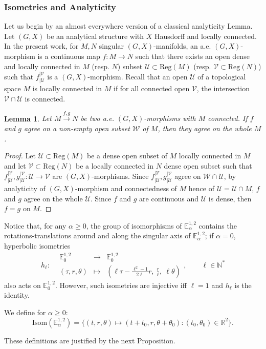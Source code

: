 \documentclass[a4paper,12pt]{article}
\def\U{\mathcal U}
\def\isom{Isom}
\def\V{\mathcal V}
\def\E{\mathbf E}
\def\N{\mathbb N}
\def\E{\mathbb{E}}
\def\RR{\mathbb{R}}
\newcommand{\mass}[1]{{\mathbb E}^{1,2}_{#1}}
\def\isom{\mathrm{Isom}}
\def\Reg{\mathrm{Reg}}
\def\reg{\Reg}
\newcommand{\fonction}[5]{\displaystyle#1:\begin{array}{l|rcl}
& \displaystyle #2 & \longrightarrow & \displaystyle #3 \\
    & \displaystyle #4 & \longmapsto & \displaystyle #5 \end{array}}
\newtheorem{lemou}{Lemma}[section]          %
\begin{document}
\subsubsection{Isometries and Analyticity} \label{sec:isometries}
Let us begin by an almost everywhere version of a classical analyticity Lem\-ma.
Let $(G,X)$ be an analytical structure with $X$ Hausdorff and locally connected.
In the present work, for $M,N$ singular $(G,X)$-manifolds,  an a.e. $(G,X)$-morphism is a continuous map $f:M\rightarrow N$ such that there exists an open dense and locally connected in $M$ (resp. $N$) subset $\U\subset \reg(M)$ (resp. $\V\subset \reg(N)$) such that $f_{|\U}^{|\V}$ is a $(G,X)$-morphism. Recall that an open $\U$ of a topological space $M$ is locally connected in $M$ if for all connected open $\V$, the intersection $\V\cap \U$ is connected.

\begin{lemou}\label{btzlem:liouville} \label{lem:liouville} Let $M \xrightarrow{f,g} N$ be two a.e. $(G,X)$-morphisms with $M$ connected. If $f$ and $g$ agree on a non-empty open subset $\mathcal W$ of $M$, then they agree on the whole $M$.
\end{lemou}
\begin{proof}
Let $\U\subset \reg(M)$ be a dense open subset of $M$ locally connected in $M$  and let $\V\subset \reg(N)$ be a locally connected in $N$ dense open subset such that $f_{|\U}^{|\V},g_{|\U}^{|\V}: \U\rightarrow \V$ are $(G,X)$-morphisms. Since $f_{|\U}^{|\V},g_{|\U}^{|\V}$ agree on $\mathcal W\cap \U$, by analyticity of $(G,X)$-morphism and connectedness of $M $ hence of $\U=\U\cap M$, $f$ and $g$ agree on the whole $\U$. Since $f$ and $g$ are continuous and $\U$ is dense, then $f=g$ on $M$.
\end{proof}

 Notice that, for any $\alpha\geq 0$, the group of isomorphisms of $\mass{\alpha}$ contains the rotations-translations around and along the singular axis of $\mass{\alpha}$; 
if $\alpha=0$, hyperbolic isometries 
$$\fonction{h_\ell}{\mass{0}}{\mass{0}}{(\tau,r,\theta)}{\left(\ell \tau - \frac{\ell^2-1}{2\ell}r,\ \frac{r}{\ell},\  \ell\theta\right)},\quad\quad \ell \in \N^*$$
also acts on $\mass{0}$. However, such isometries are injective iff $\ell=1$ and $h_\ell$ is the identity. 

We define for $\alpha\geq 0$:
$$\isom(\E^{1,2}_\alpha) = \{(t,r,\theta)\mapsto (t+t_0,r,\theta+\theta_0): (t_0,\theta_0) \in \RR^2\}.$$

These definitions are justified by the next Proposition.
\end{document}
